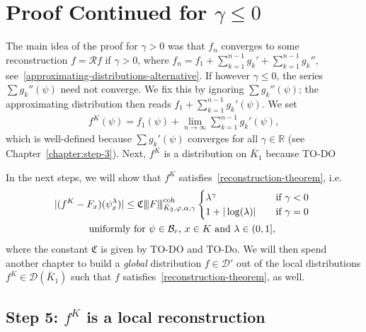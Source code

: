 


\chapter{Proof Continued for \texorpdfstring{\(\gamma \leq 0\)}{gamma <= 0}}\label{chapter:proof-gamma-negative}

The main idea of the proof for \(\gamma > 0\) was that \(f_n\) converges to some reconstruction \(f = \mathcal{R}f\) if \(\gamma > 0\), where \(f_n = f_1 + \sum\limits^{n-1}_{k=1} g_k'  + \sum\limits^{n-1}_{k=1} g_k''\), see~\eqref{approximating-distributions-alternative}.   
If however \(\gamma \leq 0\), the series \(\sum g_k''(\psi)\) need not converge. We fix this by ignoring \(\sum g_k''(\psi)\); the approximating distribution then reads \(f_1 + \sum\limits^{n-1}_{k=1} g_k'(\psi)\). We set 
\begin{align*}
    f^K(\psi) = f_1(\psi) + \lim_{n\to \infty}\sum^{n-1}_{k=1} g_k'(\psi),
\end{align*}
which is well-defined because \(\sum g_k'(\psi)\) converges for all \(\gamma \in \mathbb{R}\) (see Chapter~\ref{chapter:step-3}). Next, \(f^K\) is a distribution on \(\bar K_1\) because TO-DO

In the next steps, we will show that \(f^K\) satisfies~\eqref{reconstruction-theorem}, i.e.
\begin{gather*}
    |(f^K - F_x)(\psi_x^\lambda)| \leq \mathfrak{C} {\left\vert\kern-0.25ex\left\vert\kern-0.25ex\left\vert F \right\vert\kern-0.25ex\right\vert\kern-0.25ex\right\vert}^{\mathrm{coh}}_{\bar K_{2},\varphi,\alpha,\gamma} \begin{cases}
        \lambda^\gamma  &\text{if \(\gamma < 0\)}\\
        1 + |\log(\lambda)| \quad &\text{if \(\gamma = 0\) } 
    \end{cases}
    \\
    \text{uniformly for \(\psi \in \mathcal{B}_r\), \(x \in K\) and \(\lambda \in(0,1]\),   }
\end{gather*}
where the constant \(\mathfrak{C}\) is given by TO-DO and TO-Do. We will then spend another chapter to build a \emph{global} distribution \(f \in \mathcal{D}'\) out of the local distributions \(f^K \in \mathcal{D}(\bar K_1)\) such that \(f\) satisfies~\eqref{reconstruction-theorem}, as well.

\section{Step 5: \texorpdfstring{\(f^K\) is a local reconstruction}{fK is a local reconstruction}}
 
